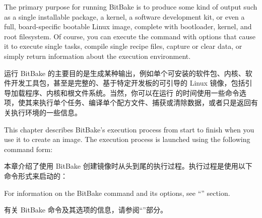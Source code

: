 
The primary purpose for running BitBake is to produce some kind of output such as a single installable package, a kernel, a software development kit, or even a full, board-specific bootable Linux image, complete with bootloader, kernel, and root filesystem. Of course, you can execute the  command with options that cause it to execute single tasks, compile single recipe files, capture or clear data, or simply return information about the execution environment.

运行 BitBake 的主要目的是生成某种输出，例如单个可安装的软件包、内核、软件开发工具包，甚至是完整的、基于特定开发板的可引导的 Linux 镜像，包括引导加载程序、内核和根文件系统。当然，你可以在运行  的时间使用一些命令选项，使其来执行单个任务、编译单个配方文件、捕获或清除数据，或者只是返回有关执行环境的一些信息。

This chapter describes BitBake's execution process from start to finish when you use it to create an image. The execution process is launched using the following command form:

本章介绍了使用 BitBake 创建镜像时从头到尾的执行过程。执行过程是使用以下命令形式来启动的：


For information on the BitBake command and its options, see ``'' section.

有关 BitBake 命令及其选项的信息，请参阅``''部分。

